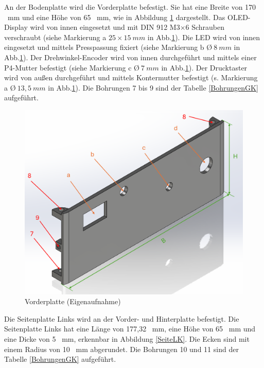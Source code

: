 An der Bodenplatte wird die Vorderplatte befestigt. Sie hat eine Breite von 170 \ mm und eine Höhe von 65 \ mm, wie in Abbildung \ref{VorneK} dargestellt. Das OLED-Display wird von innen eingesetzt und mit DIN 912 M3$\times$6 Schrauben verschraubt (siehe Markierung a $25 \times 15 \ mm$  in Abb.\ref{VorneK}). Die LED wird von innen eingesetzt und mittels Presspassung fixiert (siehe Markierung b \O $ \ 8 \ mm$ in Abb.\ref{VorneK}). Der Drehwinkel-Encoder wird von innen durchgeführt und mittels einer P4-Mutter befestigt (siehe Markierung c \O $ \ 7 \ mm$  in Abb.\ref{VorneK}). Der Drucktaster wird von außen durchgeführt und mittels Kontermutter befestigt (s. Markierung a \O $ \ 13,5 \ mm$  in Abb.\ref{VorneK}). Die Bohrungen 7 bis 9 sind der Tabelle \ref{BohrungenGK} aufgeführt.  


\begin{figure}[H]
	\begin{center}
		\includegraphics[width=\textwidth]{Images/Konstruktion/VorneK.png}
		\caption{Vorderplatte (Eigenaufnahme)} \label{VorneK}
	\end{center}
\end{figure}

Die Seitenplatte Links wird an der Vorder- und Hinterplatte befestigt. Die Seitenplatte Links hat eine Länge von 177,32 \ mm, eine Höhe von 65 \ mm und eine Dicke von 5 \ mm, erkennbar in Abbildung \ref{SeiteLK}. Die Ecken sind mit einem Radius von 10 \ mm abgerundet. Die Bohrungen 10 und 11 sind der Tabelle \ref{BohrungenGK} aufgeführt. 


